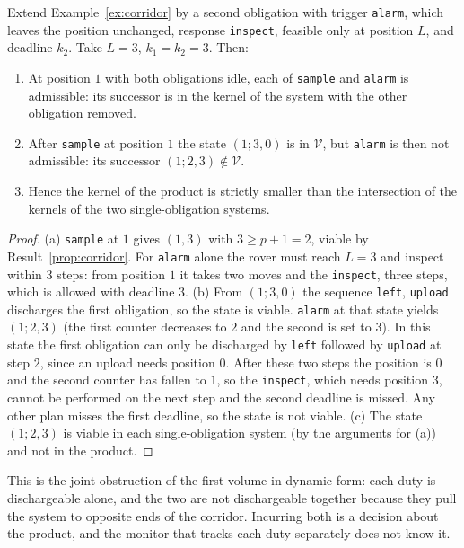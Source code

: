 \begin{newresult}\label{prop:joint-obl}
Extend Example~\ref{ex:corridor} by a second obligation with trigger \texttt{alarm}, which leaves the position unchanged, response \texttt{inspect}, feasible only at position $L$, and deadline $k_2$. Take $L=3$, $k_1=k_2=3$. Then:
\begin{enumerate}[nosep,label=(\alph*)]
  \item At position $1$ with both obligations idle, each of \texttt{sample} and \texttt{alarm} is admissible: its successor is in the kernel of the system with the other obligation removed.
  \item After \texttt{sample} at position $1$ the state $(1;3,0)$ is in $\mathcal V$, but \texttt{alarm} is then not admissible: its successor $(1;2,3)\notin\mathcal V$.
  \item Hence the kernel of the product is strictly smaller than the intersection of the kernels of the two single-obligation systems.
\end{enumerate}
\end{newresult}
\begin{proof}
(a) \texttt{sample} at $1$ gives $(1,3)$ with $3\ge p+1=2$, viable by Result~\ref{prop:corridor}. For \texttt{alarm} alone the rover must reach $L=3$ and inspect within $3$ steps: from position $1$ it takes two moves and the \texttt{inspect}, three steps, which is allowed with deadline $3$. (b) From $(1;3,0)$ the sequence \texttt{left}, \texttt{upload} discharges the first obligation, so the state is viable. \texttt{alarm} at that state yields $(1;2,3)$ (the first counter decreases to $2$ and the second is set to $3$). In this state the first obligation can only be discharged by \texttt{left} followed by \texttt{upload} at step $2$, since an upload needs position $0$. After these two steps the position is $0$ and the second counter has fallen to $1$, so the \texttt{inspect}, which needs position $3$, cannot be performed on the next step and the second deadline is missed. Any other plan misses the first deadline, so the state is not viable. (c) The state $(1;2,3)$ is viable in each single-obligation system (by the arguments for (a)) and not in the product.
\end{proof}

This is the joint obstruction of the first volume in dynamic form: each duty is dischargeable alone, and the two are not dischargeable together because they pull the system to opposite ends of the corridor. Incurring both is a decision about the product, and the monitor that tracks each duty separately does not know it.

